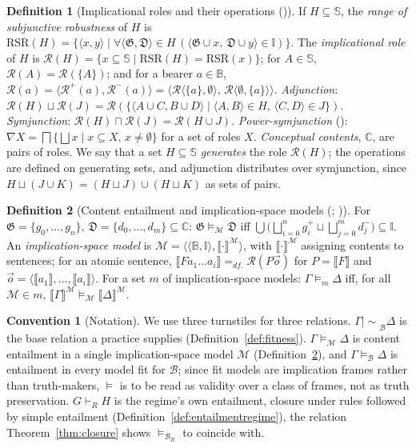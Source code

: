 \documentclass[12pt]{article}
\newcommand{\B}{\mathbb{B}}   %
\newcommand{\I}{\mathbb{I}}
\newcommand{\imp}{\mathrel{\mid\!\sim}}
\theoremstyle{definition}
\newtheorem{definition}{Definition}
\newtheorem{convention}{Convention}
\newcommand{\tuple}[1]{\langle #1 \rangle}
\newcommand{\Sp}{\mathbb{S}}    %
\newcommand{\sem}[1]{\llbracket #1 \rrbracket}  %
\newcommand{\bmap}{\mathfrak{B}}  %
\newcommand{\RSR}{\mathrm{RSR}}   %
\newcommand{\role}{\mathcal{R}}   %
\newcommand{\Cbb}{\mathbb{C}}     %
\newcommand{\Mcal}{\mathcal{M}}   %
\newcommand{\Bcal}{\mathcal{B}}   %
\begin{document}
\begin{definition}[Implicational roles and their operations {(\citealp[Ch.~5]{hlobil2025reasons})}]
\label{def:roles}
If $H \subseteq \Sp$, the \textit{range of subjunctive robustness} of $H$ is $\RSR(H) = \{\tuple{x, y} \mid \forall \tuple{\mathfrak{G}, \mathfrak{D}} \in H \, (\tuple{\mathfrak{G} \cup x,\, \mathfrak{D} \cup y} \in \I)\}$. The \textit{implicational role} of $H$ is $\role(H) = \{x \subseteq \Sp \mid \RSR(H) = \RSR(x)\}$; for $A \in \Sp$, $\role(A) = \role(\{A\})$; and for a bearer $a \in \B$, $\role(a) = \tuple{\role^{+}(a), \role^{-}(a)} = \tuple{\role\tuple{\{a\}, \emptyset},\, \role\tuple{\emptyset, \{a\}}}$. \textit{Adjunction}: $\role(H) \sqcup \role(J) = \role(\{\tuple{A \cup C, B \cup D} \mid \tuple{A, B} \in H,\, \tuple{C, D} \in J\})$. \textit{Symjunction}: $\role(H) \sqcap \role(J) = \role(H \cup J)$. \textit{Power-symjunction} (\citealp{hlobil2026firstorder}): $\nabla X = \bigsqcap\{\bigsqcup x \mid x \subseteq X,\, x \neq \emptyset\}$ for a set of roles $X$. \textit{Conceptual contents}, $\Cbb$, are pairs of roles. We say that a set $H \subseteq \Sp$ \textit{generates} the role $\role(H)$; the operations are defined on generating sets, and adjunction distributes over symjunction, since $H \sqcup (J \cup K) = (H \sqcup J) \cup (H \sqcup K)$ as sets of pairs.
\end{definition}

\begin{definition}[Content entailment and implication-space models {(\citealp[Ch.~5]{hlobil2025reasons}; \citealp{hlobil2026firstorder})}]
\label{def:contententailment}
For $\mathfrak{G} = \{g_0, \ldots, g_n\},\, \mathfrak{D} = \{d_0, \ldots, d_m\} \subseteq \Cbb$: $\mathfrak{G} \models_{\Mcal} \mathfrak{D}$ iff $\bigcup \bigl( \bigsqcup_{i=0}^{n} g_i^{+} \sqcup \bigsqcup_{j=0}^{m} d_j^{-} \bigr) \subseteq \I$. An \textit{implication-space model} is $\Mcal = \tuple{\tuple{\B, \I}, \sem{\cdot}^{\Mcal}}$, with $\sem{\cdot}^{\Mcal}$ assigning contents to sentences; for an atomic sentence, $\sem{F a_1 \ldots a_i} =_{df.} \role(P\vec{o})$ for $P = \sem{F}$ and $\vec{o} = \tuple{\sem{a_1}, \ldots, \sem{a_i}}$. For a set $m$ of implication-space models: $\Gamma \models_m \Delta$ iff, for all $\Mcal \in m$, $\sem{\Gamma}^{\Mcal} \models_{\Mcal} \sem{\Delta}^{\Mcal}$.
\end{definition}

\begin{convention}[Notation]
We use three turnstiles for three relations. $\Gamma \mathrel{\imp_{\Bcal}} \Delta$ is the base relation a practice supplies (Definition~\ref{def:fitness}). $\Gamma \models_{\Mcal} \Delta$ is content entailment in a single implication-space model $\Mcal$ (Definition~\ref{def:contententailment}), and $\Gamma \models_{\Bcal} \Delta$ is entailment in every model fit for $\Bcal$; since fit models are implication frames rather than truth-makers, $\models$ is to be read as validity over a class of frames, not as truth preservation. $G \vdash_R H$ is the regime's own entailment, closure under rules followed by simple entailment (Definition~\ref{def:entailmentregime}), the relation Theorem~\ref{thm:closure} shows $\models_{\Bcal_R}$ to coincide with.
\end{convention}
\end{document}
